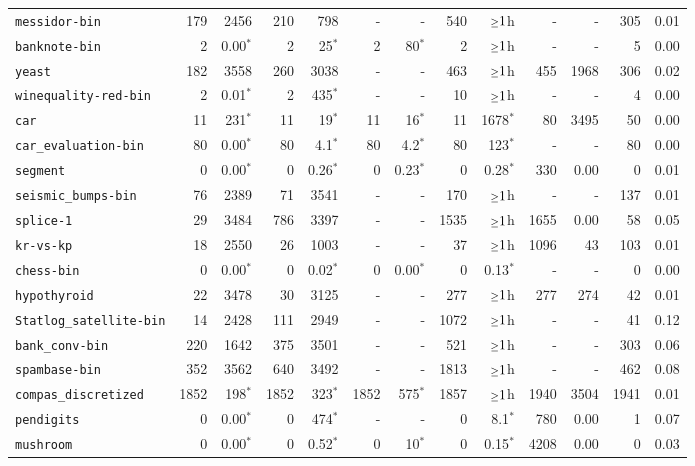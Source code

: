 \begin{tabular}{lrrrrrrrrrrrr}
\texttt{messidor-bin} & 179 & 2456 & 210 & 798 & - & - & 540 & $\mathsmaller{\geq}1$h & - & - & 305 & 0.01\\
\texttt{banknote-bin} & 2 & 0.00$^*$ & 2 & 25$^*$ & 2 & 80$^*$ & 2 & $\mathsmaller{\geq}1$h & - & - & 5 & 0.00\\
\texttt{yeast} & 182 & 3558 & 260 & 3038 & - & - & 463 & $\mathsmaller{\geq}1$h & 455 & 1968 & 306 & 0.02\\
\texttt{winequality-red-bin} & 2 & 0.01$^*$ & 2 & 435$^*$ & - & - & 10 & $\mathsmaller{\geq}1$h & - & - & 4 & 0.00\\
\texttt{car} & 11 & 231$^*$ & 11 & 19$^*$ & 11 & 16$^*$ & 11 & 1678$^*$ & 80 & 3495 & 50 & 0.00\\
\texttt{car\_evaluation-bin} & 80 & 0.00$^*$ & 80 & 4.1$^*$ & 80 & 4.2$^*$ & 80 & 123$^*$ & - & - & 80 & 0.00\\
\texttt{segment} & 0 & 0.00$^*$ & 0 & 0.26$^*$ & 0 & 0.23$^*$ & 0 & 0.28$^*$ & 330 & 0.00 & 0 & 0.01\\
\texttt{seismic\_bumps-bin} & 76 & 2389 & 71 & 3541 & - & - & 170 & $\mathsmaller{\geq}1$h & - & - & 137 & 0.01\\
\texttt{splice-1} & 29 & 3484 & 786 & 3397 & - & - & 1535 & $\mathsmaller{\geq}1$h & 1655 & 0.00 & 58 & 0.05\\
\texttt{kr-vs-kp} & 18 & 2550 & 26 & 1003 & - & - & 37 & $\mathsmaller{\geq}1$h & 1096 & 43 & 103 & 0.01\\
\texttt{chess-bin} & 0 & 0.00$^*$ & 0 & 0.02$^*$ & 0 & 0.00$^*$ & 0 & 0.13$^*$ & - & - & 0 & 0.00\\
\texttt{hypothyroid} & 22 & 3478 & 30 & 3125 & - & - & 277 & $\mathsmaller{\geq}1$h & 277 & 274 & 42 & 0.01\\
\texttt{Statlog\_satellite-bin} & 14 & 2428 & 111 & 2949 & - & - & 1072 & $\mathsmaller{\geq}1$h & - & - & 41 & 0.12\\
\texttt{bank\_conv-bin} & 220 & 1642 & 375 & 3501 & - & - & 521 & $\mathsmaller{\geq}1$h & - & - & 303 & 0.06\\
\texttt{spambase-bin} & 352 & 3562 & 640 & 3492 & - & - & 1813 & $\mathsmaller{\geq}1$h & - & - & 462 & 0.08\\
\texttt{compas\_discretized} & 1852 & 198$^*$ & 1852 & 323$^*$ & 1852 & 575$^*$ & 1857 & $\mathsmaller{\geq}1$h & 1940 & 3504 & 1941 & 0.01\\
\texttt{pendigits} & 0 & 0.00$^*$ & 0 & 474$^*$ & - & - & 0 & 8.1$^*$ & 780 & 0.00 & 1 & 0.07\\
\texttt{mushroom} & 0 & 0.00$^*$ & 0 & 0.52$^*$ & 0 & 10$^*$ & 0 & 0.15$^*$ & 4208 & 0.00 & 0 & 0.03\\

\end{tabular}
